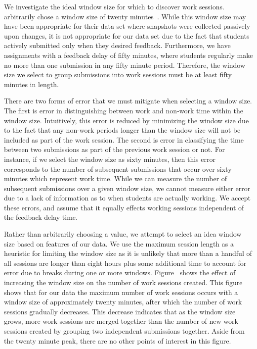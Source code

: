 We investigate the ideal window size for which to discover work
sessions. \spacco{} arbitrarily chose a window size of twenty
minutes~\cite{Spacco:2013:TIP:2462476.2465594}. While this window size may have
been appropriate for their data set where snapshots were collected passively
upon changes, it is not appropriate for our data set due to the fact that
students actively submitted only when they desired feedback. Furthermore, we
have assignments with a feedback delay of fifty minutes, where students
regularly make no more than one submission in any fifty minute
period. Therefore, the window size we select to group submissions into work
sessions must be at least fifty minutes in length.

There are two forms of error that we must mitigate when selecting a window
size. The first is error in distinguishing between work and non-work time
within the window size. Intuitively, this error is reduced by minimizing the
window size due to the fact that any non-work periods longer than the window
size will not be included as part of the work session. The second is error in
classifying the time between two submissions as part of the previous work
session or not. For instance, if we select the window size as sixty minutes,
then this error corresponds to the number of subsequent submissions that occur
over sixty minutes which represent work time. While we can measure the number
of subsequent submissions over a given window size, we cannot measure either
error due to a lack of information as to when students are actually working. We
accept these errors, and assume that it equally effects working sessions
independent of the feedback delay time.

Rather than arbitrarily choosing a value, we attempt to select an idea window
size based on features of our data. We use the maximum session length as a
heuristic for limiting the window size as it is unlikely that more than a
handful of all sessions are longer than eight hours plus some additional time
to account for error due to breaks during one or more
windows. Figure~ shows the effect of increasing the
window size on the number of work sessions created. This figure shows that for
our data the maximum number of work sessions occurs with a window size of
approximately twenty minutes, after which the number of work sessions gradually
decreases. This decrease indicates that as the window size grows, more work
sessions are merged together than the number of new work sessions created by
grouping two independent submissions together. Aside from the twenty minute
peak, there are no other points of interest in this figure.

